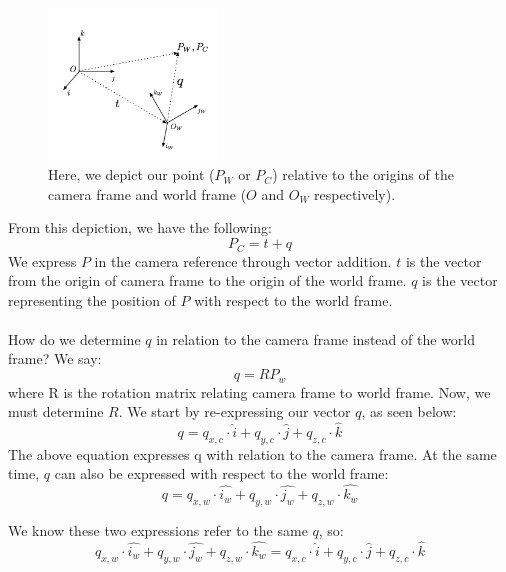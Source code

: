 \documentclass[]{article}
\begin{document}
	\begin{figure}[H]
		\includegraphics[width=0.4\textwidth]{vik_image_3.png}
		\centering
		\caption{Here, we depict our point ($P_W$ or $P_C$) relative to the origins of the camera frame and world frame ($O$ and $O_W$ respectively). }
		\label{fig:camera_coordinates}
	\end{figure}
	
	From this depiction, we have the following:
	\begin{equation}
	\label{eq:ising}
	P_{C} = t + q
	\end{equation}
	We express $P$ in the camera reference through vector addition. $t$ is the vector from the origin of camera frame to the origin of the world frame. $q$ is the vector representing the position of $P$ with respect to the world frame.\\\\
	How do we determine $q$ in relation to the camera frame instead of the world frame? We say:
	\begin{equation}
	\label{eq:ising}
	q = RP_{w}
	\end{equation}
	where R is the rotation matrix relating camera frame to world frame. Now, we must determine $R$. We start by re-expressing our vector $q$, as seen below:
	\begin{equation}
	\label{eq:1}
	q = q_{x,c} \cdot \hat{i} + q_{y,c} \cdot \hat{j} + q_{z,c} \cdot \hat{k}
	\end{equation}
	The above equation expresses q with relation to the camera frame.
	At the same time, $q$ can also be expressed with respect to the world frame:
	\begin{equation}
	\label{eq:ising}
	q = q_{x,w} \cdot \hat{i_{w}} + q_{y,w} \cdot \hat{j_{w}} + q_{z,w} \cdot \hat{k_{w}}
	\end{equation}
	
	We know these two expressions refer to the same $q$, so:
	\begin{equation}
	\label{eq:ising}
	q_{x,w} \cdot \hat{i_{w}} + q_{y,w} \cdot \hat{j_{w}} + q_{z,w} \cdot \hat{k_{w}} = q_{x,c} \cdot \hat{i} + q_{y,c} \cdot \hat{j} + q_{z,c} \cdot \hat{k}
	\end{equation}
	
\end{document}
